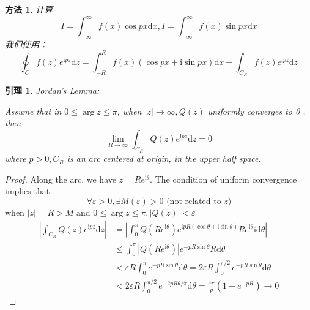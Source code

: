 \documentclass[10pt, a4paper, oneside]{ctexbook}
\newtheorem{lemma}[theorem]{引理}
\newtheorem{method}[theorem]{方法}
\def\D{\mathrm{d}}
\begin{document}
\begin{method}
    计算
    $$
        I=\int_{-\infty}^{\infty} f(x) \cos p x \D x, I=\int_{-\infty}^{\infty} f(x) \sin p x \D x
    $$\rm
    我们使用：
    $$
        \oint_{C} f(z) e^{\mathrm{i} p z} \D z=\int_{-R}^{R} f(x)(\cos p x+\mathrm{i} \sin p x) \D x+\int_{C_{R}} f(z) e^{\mathrm{i} p z} \D z
    $$
\end{method}
\begin{lemma}
    Jordan's Lemma:\rm

    Assume that in $0 \leq \arg z \leq \pi$, when $|z| \rightarrow \infty, Q(z)$ uniformly converges to 0 . then
    $$
        \lim _{R \rightarrow \infty} \int_{C_{R}} Q(z) e^{\mathrm{i} p z} \D z=0
    $$
    where $p>0, C_{R}$ is an arc centered at origin, in the upper half space.
\end{lemma}
\begin{proof} Along the arc, we have $z=R e^{\mathrm{i} \theta}$.
    The condition of uniform convergence implies that $$\forall \varepsilon>0, \exists M(\varepsilon)>0 \text { (not related to } z)$$ when $|z|=R>M
        \text { and } 0 \leq \arg z \leq \pi,|Q(z)|<\varepsilon $
    $$
        \begin{aligned}
            \left|\int_{C_{R}} Q(z) e^{\mathrm{i} p z} \D z\right| & =\left|\int_{0}^{\pi} Q\left(R e^{\mathrm{i} \theta}\right) e^{\mathrm{i} p R(\cos \theta+\mathrm{i} \sin \theta)} R e^{\mathrm{i} \theta} \mathrm{i} \D \theta\right| \\
                                                                   & \leq \int_{0}^{\pi}\left|Q\left(R e^{\mathrm{i} \theta}\right)\right| e^{-p R \sin \theta} R \D \theta                                                                 \\
                                                                   & <\varepsilon R \int_{0}^{\pi} e^{-p R \sin \theta} \D \theta=2 \varepsilon R \int_{0}^{\pi / 2} e^{-p R \sin \theta} \D \theta                                         \\
                                                                   & <2 \varepsilon R \int_{0}^{\pi / 2} e^{-2 p R \theta / \pi} \D \theta=\frac{\varepsilon \pi}{p}\left(1-e^{-p R}\right) \to 0
        \end{aligned}
    $$
\end{proof}
\end{document}
